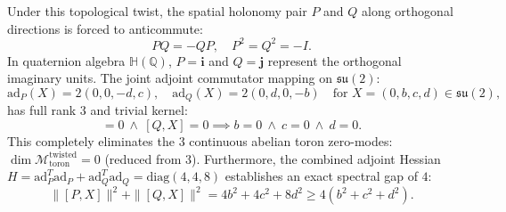 \documentclass[11pt,a4paper]{article}
\theoremstyle{definition}
\theoremstyle{remark}
\newcommand{\ad}{\mathrm{ad}}
\newcommand{\diag}{\mathrm{diag}}
\begin{document}
Under this topological twist, the spatial holonomy pair $P$ and $Q$ along orthogonal directions is forced to anticommute:
\begin{equation}
P Q = - Q P, \quad P^2 = Q^2 = -I.
\end{equation}
In quaternion algebra $\mathbb{H}(\mathbb{Q})$, $P = \mathbf{i}$ and $Q = \mathbf{j}$ represent the orthogonal imaginary units. The joint adjoint commutator mapping on $\mathfrak{su}(2)$:
\begin{equation}
\ad_P(X) = 2(0, 0, -d, c), \quad \ad_Q(X) = 2(0, d, 0, -b) \quad \text{for } X = (0, b, c, d) \in \mathfrak{su}(2),
\end{equation}
has full rank 3 and trivial kernel:
\begin{equation}
[P, X] = 0 \ \land \ [Q, X] = 0 \implies b = 0 \ \land \ c = 0 \ \land \ d = 0.
\end{equation}
This completely eliminates the 3 continuous abelian toron zero-modes: $\dim \mathcal{M}_{\mathrm{toron}}^{\mathrm{twisted}} = 0$ (reduced from 3). Furthermore, the combined adjoint Hessian $H = \ad_P^T \ad_P + \ad_Q^T \ad_Q = \diag(4, 4, 8)$ establishes an exact spectral gap of $4$:
\begin{equation}
\|[P, X]\|^2 + \|[Q, X]\|^2 = 4b^2 + 4c^2 + 8d^2 \ge 4(b^2 + c^2 + d^2).
\end{equation}
\end{document}

